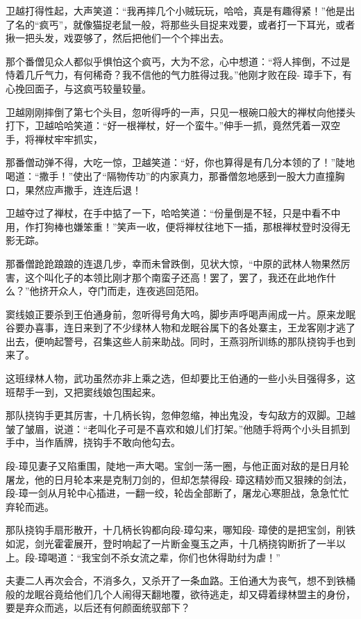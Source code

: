 \documentclass[12pt,oneside]{book}
\begin{document}
卫越打得性起，大声笑道：``我再摔几个小贼玩玩，哈哈，真是有趣得紧！''他是出了名的``疯丐''，就像猫捉老鼠一般，将那些头目捉来戏要，或者打一下耳光，或者揪一把头发，戏耍够了，然后把他们一个个摔出去。

那个番僧见众人都似乎惧怕这个疯丐，大为不忿，心中想道：``将人摔倒，不过是恃着几斤气力，有何稀奇？我不信他的气力胜得过我。''他刚才败在段-
璋手下，有心挽回面子，与这疯丐较量较量。

卫越刚刚摔倒了第七个头目，忽听得呼的一声，只见一根碗口般大的禅杖向他搂头打下，卫越哈哈笑道：``好一根禅杖，好一个蛮牛。''伸手一抓，竟然凭着一双空手，将禅杖牢牢抓实，

那番僧动弹不得，大吃一惊，卫越笑道：``好，你也算得是有几分本领的了！''陡地喝道：``撒手！''使出了``隔物传功''的内家真力，那番僧忽地感到一股大力直撞胸口，果然应声撒手，连连后退！

卫越夺过了禅杖，在手中掂了一下，哈哈笑道：``份量倒是不轻，只是中看不中用，作打狗棒也嫌笨重！''笑声一收，便将禅杖往地下一插，那根禅杖登时没得无影无踪。

那番僧跄跄踉踉的连退几步，幸而未曾跌倒，见状大惊，``中原的武林人物果然厉害，这个叫化子的本领比刚才那个南蛮子还高！罢了，罢了，我还在此地作什么？''他挤开众人，夺门而走，连夜逃回范阳。

窦线娘正要杀到王伯通身前，忽听得号角大呜，脚步声呼喝声闹成一片。原来龙眠谷要办喜事，连日来到了不少绿林人物和龙眠谷属下的各处寨主，王龙客刚才逃了出去，便响起警号，召集这些人前来助战。同时，王燕羽所训练的那队挠钩手也到来了。

这班绿林人物，武功虽然亦非上乘之选，但却要比王伯通的一些小头目强得多，这班帮手一到，又把窦线娘包围起来。

那队挠钩手更其厉害，十几柄长钩，忽伸忽缩，神出鬼没，专勾敌方的双脚。卫越皱了皱眉，说道：``老叫化子可是不喜欢和娘儿们打架。''他随手将两个小头目抓到手中，当作盾牌，挠钩手不敢向他勾去。

段-璋见妻子又陷重围，陡地一声大喝。宝剑一荡一圈，与他正面对敌的是日月轮屠龙，他的日月轮本来是克制刀剑的，但却怎禁得段-
璋这精妙而又狠辣的剑法，段-璋一剑从月轮中心插进，一翻一绞，轮齿全部断了，屠龙心寒胆战，急急忙忙弃轮而逃。

那队挠钩手扇形散开，十几柄长钩都向段-璋勾来，哪知段-
璋使的是把宝剑，削铁如泥，剑光霍霍展开，登时响起了一片断金戛玉之声，十几柄挠钩断折了一半以上。段-璋喝道：``我宝剑不杀女流之辈，你们也休得助纣为虐！''

夫妻二人再次会合，不消多久，又杀开了一条血路。王伯通大为丧气，想不到铁桶般的龙眠谷竟给他们几个人闹得天翻地覆，欲待逃走，却又碍着绿林盟主的身份，要是弃众而逃，以后还有何颜面统驭部下？
\end{document}
